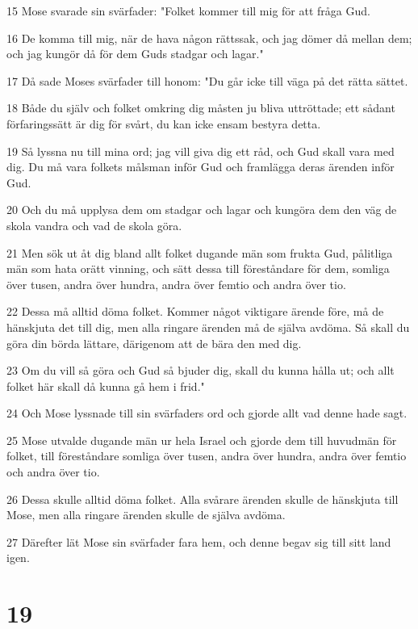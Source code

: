 \par 15 Mose svarade sin svärfader: "Folket kommer till mig för att fråga Gud.
\par 16 De komma till mig, när de hava någon rättssak, och jag dömer då mellan dem; och jag kungör då för dem Guds stadgar och lagar."
\par 17 Då sade Moses svärfader till honom: "Du går icke till väga på det rätta sättet.
\par 18 Både du själv och folket omkring dig måsten ju bliva uttröttade; ett sådant förfaringssätt är dig för svårt, du kan icke ensam bestyra detta.
\par 19 Så lyssna nu till mina ord; jag vill giva dig ett råd, och Gud skall vara med dig. Du må vara folkets målsman inför Gud och framlägga deras ärenden inför Gud.
\par 20 Och du må upplysa dem om stadgar och lagar och kungöra dem den väg de skola vandra och vad de skola göra.
\par 21 Men sök ut åt dig bland allt folket dugande män som frukta Gud, pålitliga män som hata orätt vinning, och sätt dessa till föreståndare för dem, somliga över tusen, andra över hundra, andra över femtio och andra över tio.
\par 22 Dessa må alltid döma folket. Kommer något viktigare ärende före, må de hänskjuta det till dig, men alla ringare ärenden må de själva avdöma. Så skall du göra din börda lättare, därigenom att de bära den med dig.
\par 23 Om du vill så göra och Gud så bjuder dig, skall du kunna hålla ut; och allt folket här skall då kunna gå hem i frid."
\par 24 Och Mose lyssnade till sin svärfaders ord och gjorde allt vad denne hade sagt.
\par 25 Mose utvalde dugande män ur hela Israel och gjorde dem till huvudmän för folket, till föreståndare somliga över tusen, andra över hundra, andra över femtio och andra över tio.
\par 26 Dessa skulle alltid döma folket. Alla svårare ärenden skulle de hänskjuta till Mose, men alla ringare ärenden skulle de själva avdöma.
\par 27 Därefter lät Mose sin svärfader fara hem, och denne begav sig till sitt land igen.

\chapter{19}

